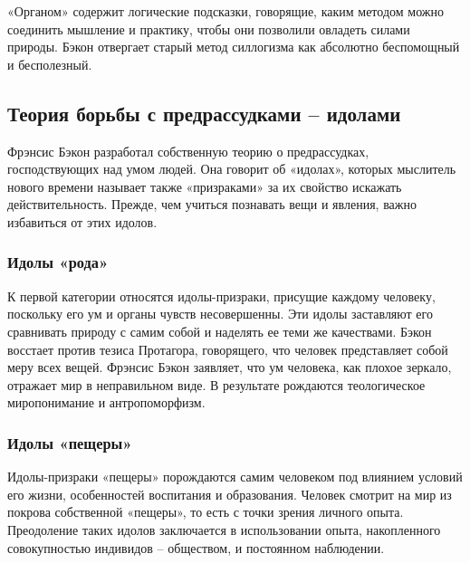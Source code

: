 \documentclass[
]{article}
\begin{document}
«Органом» содержит логические подсказки, говорящие, каким методом можно
соединить мышление и практику, чтобы они позволили овладеть силами
природы. Бэкон отвергает старый метод силлогизма как абсолютно
беспомощный и бесполезный.

\hypertarget{ux442ux435ux43eux440ux438ux44f-ux431ux43eux440ux44cux431ux44b-ux441-ux43fux440ux435ux434ux440ux430ux441ux441ux443ux434ux43aux430ux43cux438-ux438ux434ux43eux43bux430ux43cux438}{%
\subsection{Теория борьбы с предрассудками --
идолами}\label{ux442ux435ux43eux440ux438ux44f-ux431ux43eux440ux44cux431ux44b-ux441-ux43fux440ux435ux434ux440ux430ux441ux441ux443ux434ux43aux430ux43cux438-ux438ux434ux43eux43bux430ux43cux438}}

Фрэнсис Бэкон разработал собственную теорию о предрассудках,
господствующих над умом людей. Она говорит об «идолах», которых
мыслитель нового времени называет также «призраками» за их свойство
искажать действительность. Прежде, чем учиться познавать вещи и явления,
важно избавиться от этих идолов.

\hypertarget{ux438ux434ux43eux43bux44b-ux440ux43eux434ux430}{%
\subsubsection{Идолы
«рода»}\label{ux438ux434ux43eux43bux44b-ux440ux43eux434ux430}}

К первой категории относятся идолы-призраки, присущие каждому человеку,
поскольку его ум и органы чувств несовершенны. Эти идолы заставляют его
сравнивать природу с самим собой и наделять ее теми же качествами. Бэкон
восстает против тезиса Протагора, говорящего, что человек представляет
собой меру всех вещей. Фрэнсис Бэкон заявляет, что ум человека, как
плохое зеркало, отражает мир в неправильном виде. В результате рождаются
теологическое миропонимание и антропоморфизм.

\hypertarget{ux438ux434ux43eux43bux44b-ux43fux435ux449ux435ux440ux44b}{%
\subsubsection{Идолы
«пещеры»}\label{ux438ux434ux43eux43bux44b-ux43fux435ux449ux435ux440ux44b}}

Идолы-призраки «пещеры» порождаются самим человеком под влиянием условий
его жизни, особенностей воспитания и образования. Человек смотрит на мир
из покрова собственной «пещеры», то есть с точки зрения личного опыта.
Преодоление таких идолов заключается в использовании опыта, накопленного
совокупностью индивидов -- обществом, и постоянном наблюдении.
\end{document}
